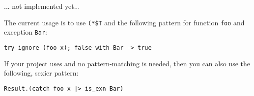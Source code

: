 
... not implemented yet...

The current usage is to use \texttt{(*\$T} and the following pattern for function \texttt{foo} and
exception \texttt{Bar}:

\begin{verbatim}
try ignore (foo x); false with Bar -> true
\end{verbatim}

If your project uses \bat{} and no pattern-matching is needed, then you can also use
the following, sexier pattern:

\begin{verbatim}
Result.(catch foo x |> is_exn Bar)
\end{verbatim}
